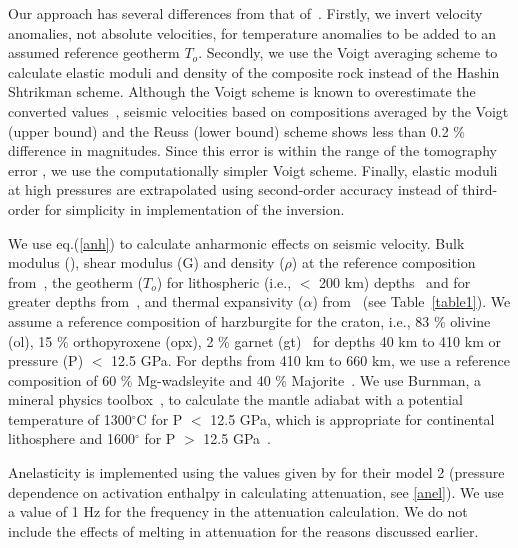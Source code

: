 \documentclass[draft,linenumbers]{agujournal2018}
\begin{document}
Our approach has several differences from that of~\citet{Cammarano2003}. Firstly, we invert velocity anomalies, not absolute velocities, for temperature anomalies to be added to an assumed reference geotherm $T_o$.  Secondly, we use the Voigt  averaging scheme to calculate elastic moduli and density of the composite rock instead of the Hashin Shtrikman scheme. Although the Voigt scheme is known to overestimate the converted values~\citep{watt_1976}, seismic velocities based on compositions averaged by the Voigt (upper bound) and the Reuss (lower bound) scheme shows less than 0.2 \% difference in magnitudes. Since this error is within the range of the tomography error \citep{Biryol_2016}, we use the computationally simpler Voigt scheme. Finally, elastic moduli at high pressures are extrapolated using second-order accuracy instead of third-order for simplicity in implementation of the inversion.

We use eq.(\ref{anh}) to calculate anharmonic effects on seismic velocity. Bulk modulus (), shear modulus (G) and density ($\rho$) at the reference  composition from~\citet{Cammarano2003}, the  geotherm ($T_o$) for lithospheric (i.e., $<$ 200 km) depths~\citep{Goes_2002} and for greater depths from~\citet{turcotte2014geodynamics}, and thermal expansivity ($\alpha$) from~\citet{saxena_data} (see Table~\ref{table1}). We assume a reference composition of harzburgite for the craton, i.e., 83 \% olivine (ol), 15 \% orthopyroxene (opx), 2 \% garnet (gt)~\citep{mcdonough1998mineralogy} for depths 40 km to 410 km or pressure (P) $<$ 12.5 GPa. For depths from 410 km to 660 km, we use a reference composition of 60 \% Mg-wadsleyite and 40 \% Majorite~\citep{haggerty1995upper}. We use Burnman, a mineral physics toolbox~\citep{cottaar2014burnman}, to calculate the mantle adiabat with a potential temperature of 1300$^{\circ}$C for P $<$ 12.5 GPa, which is appropriate for continental lithosphere \citep{rudnick1998thermal} and 1600$^{\circ}$ for P $>$ 12.5 GPa~\citep{katsura2010adiabatic}. 

Anelasticity is implemented using the values given by \citet{sobolev1996upper} for their model 2 (pressure dependence on activation enthalpy in calculating attenuation, see \ref{anel}). We use a value of 1 Hz for the frequency in the attenuation calculation. We do not include the effects of melting in attenuation for the reasons discussed earlier.
\end{document}
